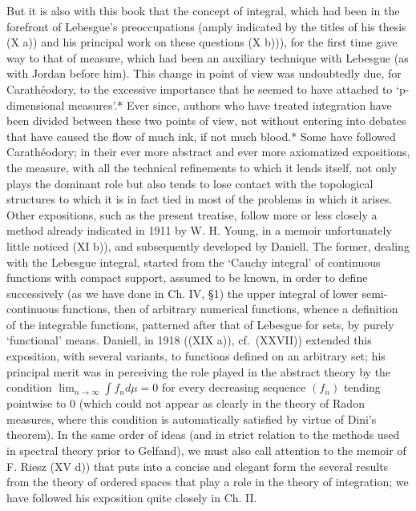 But it is also with this book that the concept of integral, which had been in the forefront of Lebesgue's preoccupations (amply indicated by the titles of his thesis (X a)) and his principal work on these questions (X b))), for the first time gave way to that of measure, which had been an auxiliary technique with Lebesgue (as with Jordan before him). This change in point of view was undoubtedly due, for Carathéodory, to the excessive importance that he seemed to have attached to `p-dimensional measures'.* Ever since, authors who have treated integration have been divided between these two points of view, not without entering into debates that have caused the flow of much ink, if not much blood.* Some have followed Carathéodory; in their ever more abstract and ever more axiomatized expositions, the measure, with all the technical refinements to which it lends itself, not only plays the dominant role but also tends to lose contact with the topological structures to which it is in fact tied in most of the problems in which it arises. Other expositions, such as the present treatise, follow more or less closely a method already indicated in 1911 by W. H. Young, in a memoir unfortunately little noticed (XI b)), and subsequently developed by Daniell. The former, dealing with the Lebesgue integral, started from the `Cauchy integral' of continuous functions with compact support, assumed to be known, in order to define successively (as we have done in Ch. IV, §1) the upper integral of lower semi-continuous functions, then of arbitrary numerical functions, whence a definition of the integrable functions, patterned after that of Lebesgue for sets, by purely `functional' means. Daniell, in 1918 ((XIX a)), cf.~(XXVII)) extended this exposition, with several variants, to functions defined on an arbitrary set; his principal merit was in perceiving the role played in the abstract theory by the condition \(\lim_{n\to \infty}\int f_n d\mu = 0\) for every decreasing sequence \((f_n)\) tending pointwise to 0 (which could not appear as clearly in the theory of Radon measures, where this condition is automatically satisfied by virtue of Dini's theorem). In the same order of ideas (and in strict relation to the methods used in spectral theory prior to Gelfand), we must also call attention to the memoir of F. Riesz (XV d)) that puts into a concise and elegant form the several results from the theory of ordered spaces that play a role in the theory of integration; we have followed his exposition quite closely in Ch. II.

